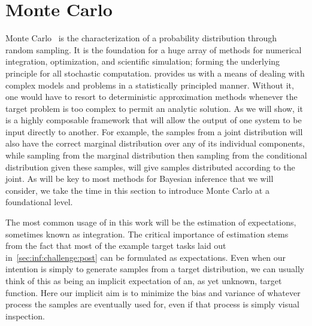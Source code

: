 
\section{Monte Carlo}
\label{sec:inf:mc}

Monte Carlo~\citep{metropolis1949monte} is the characterization of a probability distribution 
through random sampling. It is the foundation for a huge array of methods for numerical 
integration, optimization, and scientific simulation; forming the underlying principle 
for all stochastic computation.
\mc provides us with a means of dealing with complex models and problems in a
statistically principled manner.  Without it, one would have to resort to deterministic
approximation methods whenever the target problem is too complex to permit an analytic
solution.  As we will show, it is a highly composable framework that will allow the output
of one system to be input directly to another.  For example, the \mc samples from a joint
distribution will also have the correct marginal distribution over any of its individual components,
while sampling from the marginal distribution then sampling from the conditional distribution
given these samples, will give samples distributed according to the joint.  As \mc
will be key to most methods for Bayesian inference that we will consider, we take the time
in this section to introduce Monte Carlo at a foundational level.

The most common usage of \mc in this work will be the \mc estimation of expectations, 
sometimes known as \mc integration.  
The critical importance of \mc estimation stems from the fact that most of the example
target tasks laid out in~\ref{sec:inf:challenge:post} can be formulated as expectations.
Even when our intention is simply to generate samples from a target distribution, we can
usually think of this as being an implicit expectation of an, as yet unknown, target function.
Here our implicit aim is to minimize the bias and variance of whatever process the samples are eventually
used for, even if that process is simply visual inspection.  

